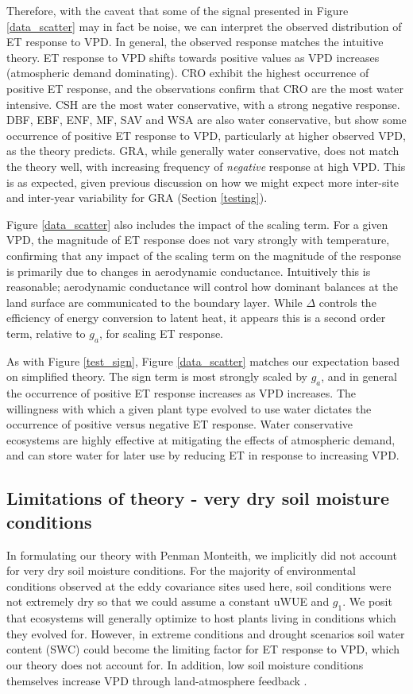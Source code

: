 \documentclass[draft,linenumbers]{afmjournal}
\begin{document}
Therefore, with the caveat that some of the signal presented in Figure
\ref{data_scatter} may in fact be noise, we can interpret the observed
distribution of ET response to VPD. In general, the observed response
matches the intuitive theory. ET response to VPD shifts towards
positive values as VPD increases (atmospheric demand dominating). CRO
exhibit the highest occurrence of positive ET response, and the
observations confirm that CRO are the most water intensive. CSH are
the most water conservative, with a strong negative response. DBF,
EBF, ENF, MF, SAV and WSA are also water conservative, but show some
occurrence of positive ET response to VPD, particularly at higher
observed VPD, as the theory predicts. GRA, while generally water
conservative, does not match the theory well, with increasing frequency of
\textit{negative} response at high VPD. This is as expected, given
previous discussion on how we might expect more inter-site and inter-year variability for GRA (Section \ref{testing}).

Figure \ref{data_scatter} also includes the impact of the scaling
term. For a given VPD, the magnitude of ET response does not vary
strongly with temperature, confirming that any impact of the scaling
term on the magnitude of the response is primarily due to changes in
aerodynamic conductance. Intuitively this is reasonable; aerodynamic
conductance will control how dominant balances at the land surface are
communicated to the boundary layer. While $\Delta$ controls the
efficiency of energy conversion to latent heat, it appears this is a
second order term, relative to $g_a$, for scaling ET response.

As with Figure \ref{test_sign}, Figure \ref{data_scatter} matches our
expectation based on simplified theory. The sign term is most strongly
scaled by $g_a$, and in general the occurrence of positive ET response
increases as VPD increases. The willingness with which a given plant type
evolved to use water dictates the occurrence of positive versus
negative ET response. Water conservative ecosystems are highly effective
at mitigating the effects of atmospheric demand, and can store water
for later use by reducing ET in response to increasing VPD.

\subsection{Limitations of theory - very dry soil moisture conditions}
\label{swc_section}
In formulating our theory with Penman Monteith, we implicitly did not
account for very dry soil moisture conditions. For the majority of
environmental conditions observed at the eddy covariance sites used
here, soil conditions were not extremely dry so that we could assume a
constant uWUE and $g_1$. We posit that ecosystems will generally
optimize to host plants living in conditions which they evolved
for. However, in extreme conditions and drought scenarios soil water
content (SWC) could become the limiting factor for ET response to VPD,
which our theory does not account for. In addition, low soil moisture
conditions themselves increase VPD through land-atmosphere feedback
\citep[][]{Bouchet_1963, Morton_1965, Brutsaert_1999, Ozdogan_2006,
  Salvucci_2013, Gentine_2016, Berg_2016}.
\end{document}
